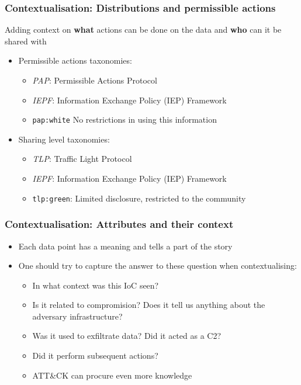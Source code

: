 \begin{frame}
    \frametitle{Contextualisation: Distributions and permissible actions}
    Adding context on \textbf{what} actions can be done on the data and \textbf{who} can it be shared with
    \begin{itemize}
        \item Permissible actions taxonomies:
        \begin{itemize}
            \item \textit{PAP}: Permissible Actions Protocol
            \item \textit{IEPF}: Information Exchange Policy (IEP) Framework
            \item \texttt{pap:white} No restrictions in using this information
        \end{itemize}
        \item Sharing level taxonomies:
        \begin{itemize}
            \item \textit{TLP}: Traffic Light Protocol
            \item \textit{IEPF}: Information Exchange Policy (IEP) Framework
            \item \texttt{tlp:green}: Limited disclosure, restricted to the community
        \end{itemize}
    \end{itemize}
\end{frame}

\begin{frame}
    \frametitle{Contextualisation: Attributes and their context}
    \begin{itemize}
        \item Each data point has a meaning and tells a part of the story
        \item One should try to capture the answer to these question when contextualising:
        \begin{itemize}
            \item In what context was this IoC seen?
            \item Is it related to compromision? Does it tell us anything about the adversary infrastructure?
            \item Was it used to exfiltrate data? Did it acted as a C2?
            \item Did it perform subsequent actions?
            \item ATT\&CK can procure even more knowledge
        \end{itemize}
    \end{itemize}
\end{frame}

